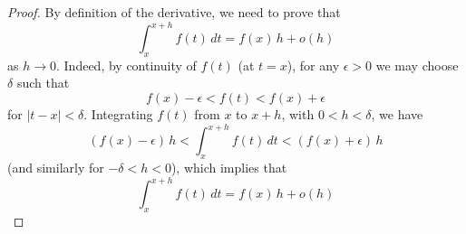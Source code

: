 

\begin{proof}
By definition of the derivative, we need to prove that 
$$
\int_x^{x+h} f(t)\,dt = f(x)\, h + o(h)
$$
as $h\to 0$. Indeed, by continuity of $f(t)$ (at $t=x$), for 
any $\epsilon>0$ we may choose $\delta$ such that
$$
f(x)-\epsilon<f(t)<f(x)+\epsilon
$$
for $|t-x|<\delta$. Integrating $f(t)$ from $x$ to $x+h$, with 
$0<h<\delta$, we have
$$
(f(x)-\epsilon)\, h < \int_x^{x+h} f(t)\,dt < (f(x)+\epsilon)\, h
$$
(and similarly for $-\delta<h<0$), which implies that 
$$
\int_x^{x+h} f(t)\,dt = f(x)\,h + o(h)
$$

\end{proof}

